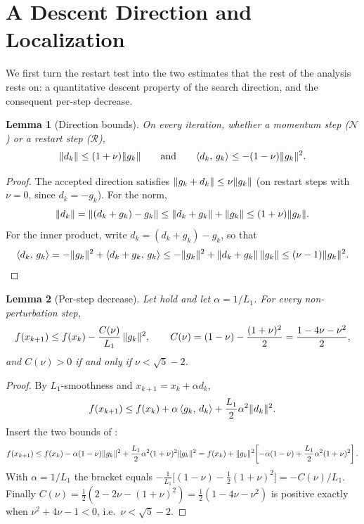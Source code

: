 \documentclass[11pt]{article}
\theoremstyle{plain}
\newtheorem{lemma}{Lemma}[section]
\theoremstyle{definition}
\theoremstyle{remark}
\DeclarePairedDelimiter{\norm}{\lVert}{\rVert}
\newcommand{\inner}[2]{\langle #1,\, #2\rangle}
\begin{document}
\section{A Descent Direction and Localization}
\label{sec:descent}

We first turn the restart test into the two estimates that the rest of
the analysis rests on: a quantitative descent property of the search
direction, and the consequent per-step decrease.

\begin{lemma}[Direction bounds]
\label{lem:dirbounds}
On every iteration, whether a momentum step ($\mathcal{N}$) or a
restart step ($\mathcal{R}$),
\begin{equation}\label{eq:dirbounds}
  \norm{d_{k}}\le(1+\nu)\norm{g_{k}}
  \qquad\text{and}\qquad
  \inner{d_{k}}{g_{k}}\le-(1-\nu)\norm{g_{k}}^{2}.
\end{equation}
\end{lemma}

\begin{proof}
The accepted direction satisfies $\norm{g_{k}+d_{k}}\le\nu\norm{g_{k}}$
(on restart steps with $\nu=0$, since $d_{k}=-g_{k}$). For the norm,
\[
  \norm{d_{k}}=\norm{(d_{k}+g_{k})-g_{k}}
  \le\norm{d_{k}+g_{k}}+\norm{g_{k}}
  \le(1+\nu)\norm{g_{k}}.
\]
For the inner product, write $d_{k}=(d_{k}+g_{k})-g_{k}$, so that
\[
  \inner{d_{k}}{g_{k}}
  =-\norm{g_{k}}^{2}+\inner{d_{k}+g_{k}}{g_{k}}
  \le-\norm{g_{k}}^{2}+\norm{d_{k}+g_{k}}\,\norm{g_{k}}
  \le(\nu-1)\norm{g_{k}}^{2}. \qedhere
\]
\end{proof}

\begin{lemma}[Per-step decrease]
\label{lem:descent}
Let  hold and let $\alpha=1/L_{1}$. For every
non-perturbation step,
\begin{equation}\label{eq:descent}
  f(x_{k+1})\le f(x_{k})-\frac{C(\nu)}{L_{1}}\,\norm{g_{k}}^{2},
  \qquad
  C(\nu)=(1-\nu)-\frac{(1+\nu)^{2}}{2}=\frac{1-4\nu-\nu^{2}}{2},
\end{equation}
and $C(\nu)>0$ if and only if $\nu<\sqrt{5}-2$.
\end{lemma}

\begin{proof}
By $L_{1}$-smoothness and $x_{k+1}=x_{k}+\alpha d_{k}$,
\[
  f(x_{k+1})\le f(x_{k})+\alpha\,\inner{g_{k}}{d_{k}}
  +\frac{L_{1}}{2}\alpha^{2}\norm{d_{k}}^{2}.
\]
Insert the two bounds of :
\[
  f(x_{k+1})\le f(x_{k})
  -\alpha(1-\nu)\norm{g_{k}}^{2}
  +\frac{L_{1}}{2}\alpha^{2}(1+\nu)^{2}\norm{g_{k}}^{2}
  = f(x_{k})+\norm{g_{k}}^{2}\!\left[-\alpha(1-\nu)
  +\frac{L_{1}}{2}\alpha^{2}(1+\nu)^{2}\right].
\]
With $\alpha=1/L_{1}$ the bracket equals
$-\tfrac{1}{L_{1}}\big[(1-\nu)-\tfrac{1}{2}(1+\nu)^{2}\big]
=-C(\nu)/L_{1}$. Finally
$C(\nu)=\tfrac12(2-2\nu-(1+\nu)^{2})=\tfrac12(1-4\nu-\nu^{2})$ is
positive exactly when $\nu^{2}+4\nu-1<0$, i.e.\ $\nu<\sqrt5-2$.
\end{proof}
\end{document}

